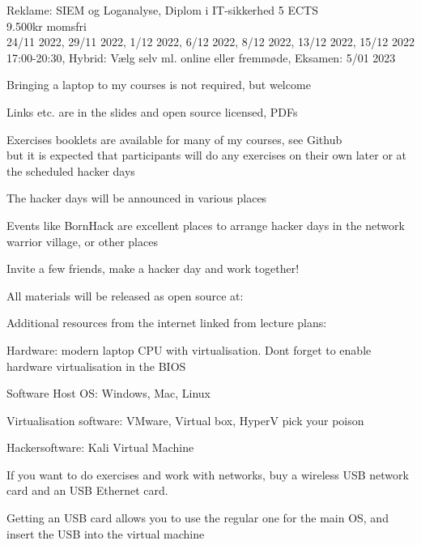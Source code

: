 \documentclass[Screen16to9,17pt]{foils}
\begin{document}
Reklame:
SIEM og Loganalyse, Diplom i IT-sikkerhed 5 ECTS\\
9.500kr momsfri\\
24/11 2022,
29/11 2022,
1/12 2022,
6/12 2022,
8/12 2022,
13/12 2022,
15/12 2022 17:00-20:30, Hybrid: Vælg selv ml. online eller fremmøde, Eksamen:
5/01 2023


\begin{list2}
\item Bringing a laptop to my courses is not required, but welcome
\item Links etc. are in the slides and open source licensed, PDFs
\item Exercises booklets are available for many of my courses, see Github\\
but it is expected that participants will do any exercises on their own later or at the scheduled hacker days
\item The hacker days will be announced in various places

\item Events like BornHack are excellent places to arrange hacker days in the network warrior village, or other places
\end{list2}
\centerline{\Large Invite a few friends, make a hacker day and work together!}

\begin{list2}
\item All materials will be released as open source at:\\
\item Additional resources from the internet linked from lecture plans:\\
\end{list2}




\begin{list2}
\item Hardware: modern laptop CPU with virtualisation.
Dont forget to enable hardware virtualisation in the BIOS
\item Software Host OS: Windows, Mac, Linux
\item Virtualisation software: VMware, Virtual box, HyperV pick your poison
\item Hackersoftware: Kali Virtual Machine 
\item If you want to do exercises and work with networks, buy a wireless USB network card and an USB Ethernet card.
\item Getting an USB card allows you to use the regular one for the main OS, and insert the USB into the virtual machine
\end{list2}
\end{document}
